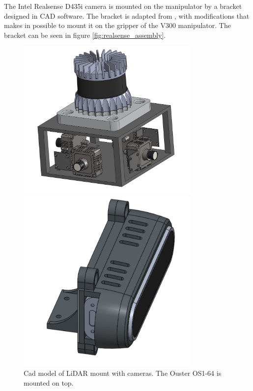 
The Intel Realsense D435i camera is mounted on the manipulator by a bracket designed in CAD software. The bracket is adapted from \cite{d435_sleeve}, with modifications that makes in possible to mount it on the gripper of the V300 manipulator. The bracket can be seen in figure \ref{fig:realsense_assembly}.

\begin{figure}[htp!]
  \centering
  \begin{minipage}[b]{0.49\textwidth}
    \centering
    \includegraphics[width = 0.8\textwidth]{Figures/lidar_mount.png}
    \caption{Cad model of LiDAR mount with cameras. The Ouster OS1-64 is mounted on top.}
     \label{fig:lidar_mount}
  \end{minipage}
  \hfill
  \begin{minipage}[b]{0.49\textwidth}
    \centering
    \includegraphics[width = 0.8\textwidth]{Figures/realsense_assembly.pdf}

\end{minipage}
\end{figure}
